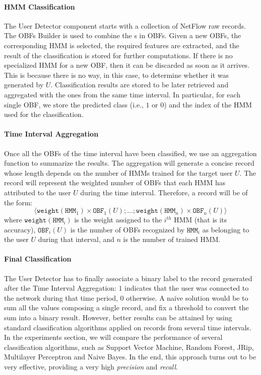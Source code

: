 \documentclass[10pt,conference,compsocconf,letterpaper]{IEEEtran}
\begin{document}
\paragraph{HMM Classification}
The User Detector component starts with a collection of NetFlow raw
records. The OBFs Builder is used to combine the \nfr s in OBFs.
Given a new OBFs, the
corresponding HMM is selected, the required features are extracted, and
the result of the classification is stored for further computations.
If there is no specialized HMM for a new OBF, then it  can be discarded as
soon as it arrives. This is because there is no way, in this case,  to determine whether it was 
generated by $U$.
Classification results are stored to be later  retrieved and aggregated with
the ones from the same time interval. In particular, for each single OBF,
we store the predicted class (i.e., $1$ or $0$) and the index of the HMM used 
for the classification.

\paragraph{Time Interval Aggregation}
Once all the OBFs of the time interval have been classified, we use an
aggregation function to summarize the results. The aggregation
will generate a concise record whose length depends on the
number of HMMs trained for the target user $U$. The record will represent the weighted number of OBFs that each HMM has
attributed to the user $U$ during the time interval. 
Therefore, a record will be of the form:
\[
\langle\texttt{weight}(\texttt{HMM}_1)\times\texttt{OBF}_{1}(U); \ldots;
\texttt{weight}(\texttt{HMM}_n)\times\texttt{OBF}_{n}(U)\rangle
\]
where $\texttt{weight}(\texttt{HMM}_i)$ is the weight assigned to the
$i^{th}$ HMM (that is its accuracy), $\texttt{OBF}_{i}(U)$ is the number of OBFs recognized
by $\mathtt{HMM}_i$ as belonging to the user $U$ during that interval,
and $n$ is the number of trained HMM.

\paragraph{Final Classification}
The User Detector has to finally associate a binary label to the
record generated after the Time Interval Aggregation: $1$ indicates
that the user was connected to the network during that time period,
$0$ otherwise. A naive solution would be to sum all the values composing a
single record, and fix a threshold to convert the sum into a binary
result. However, better results can be attained by using standard
classification algorithms applied on records from several time
intervals.  In the experiments section, we will compare the
performance of several classification algorithms, such as Support Vector
Machine, Random Forest, JRip, Multilayer Perceptron and Naive Bayes. In the end,
this approach turns out to be very effective,  providing a very high \textit{precision} and \textit{recall}.
\end{document}

